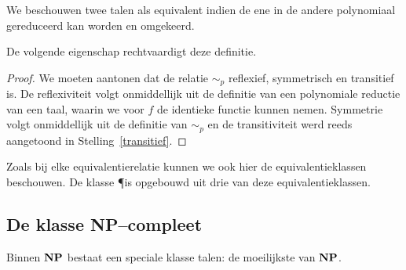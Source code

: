 We beschouwen twee talen als equivalent indien de ene in de
andere polynomiaal gereduceerd kan worden en omgekeerd.






De volgende eigenschap rechtvaardigt deze definitie.



\begin{proof}  We moeten  aantonen dat de relatie $\sim_p$
reflexief, symmetrisch en transitief is. De reflexiviteit volgt
onmiddellijk uit de definitie van een polynomiale reductie van  een
taal, waarin we voor $f$ de identieke functie kunnen nemen. Symmetrie volgt
onmiddellijk uit de definitie van $\sim_p$ en de transitiviteit werd  reeds
aangetoond in Stelling~\ref{transitief}.
\end{proof}



Zoals bij elke equivalentierelatie kunnen we ook hier de
equivalentieklassen beschouwen.  De klasse \P is opgebouwd uit drie
van deze equivalentieklassen.


\subsection{De klasse NP--compleet}

Binnen ${\bf NP}$ bestaat een speciale klasse talen: de moeilijkste van
${\bf NP}$.



